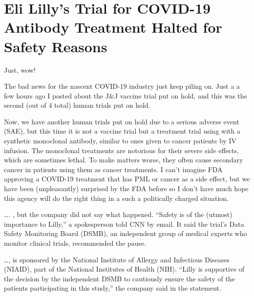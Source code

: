 \chapter{Eli Lilly's Trial for COVID-19 Antibody Treatment Halted for Safety Reasons}

\begin{refsection}

Just, wow!

The bad news for the nascent COVID-19 industry just keep piling on. Just a a few hours ago I posted about the J\&J vaccine trial put on hold, and this was the second (out of 4 total) human trials put on hold.\textsuperscript{\cite{urle755db81}}

Now, we have another human trials put on hold due to a serious adverse event (SAE), but this time it is not a vaccine trial but a treatment trial using with a synthetic monoclonal antibody, similar to ones given to cancer patients by IV infusion. The monoclonal treatments are notorious for their severe side effects, which are sometimes lethal. To make matters worse, they often cause secondary cancer in patients using them as cancer treatments. I can't imagine FDA approving a COVID-19 treatment that has PML or cancer as a side effect, but we have been (unpleasantly) surprised by the FDA before so I don't have much hope this agency will do the right thing in a such a politically charged situation.

\begin{tcolorbox}[quote]

\dots{}. , but the company did not say what happened. \enquote{Safety is of the (utmost) importance to Lilly,} a spokesperson told CNN by email. It said the trial's Data Safety Monitoring Board (DSMB), an independent group of medical experts who monitor clinical trials, recommended the pause.\textsuperscript{\cite{urlbad332a7}}

\end{tcolorbox}

\begin{tcolorbox}[quote]

\dots{}, is sponsored by the National Institute of Allergy and Infectious Diseases (NIAID), part of the National Institutes of Health (NIH). \enquote{Lilly is supportive of the decision by the independent DSMB to cautiously ensure the safety of the patients participating in this study,} the company said in the statement.\textsuperscript{\cite{urlbad332a7}}

\end{tcolorbox}

\printbibliography[heading=subbibliography]

\end{refsection}